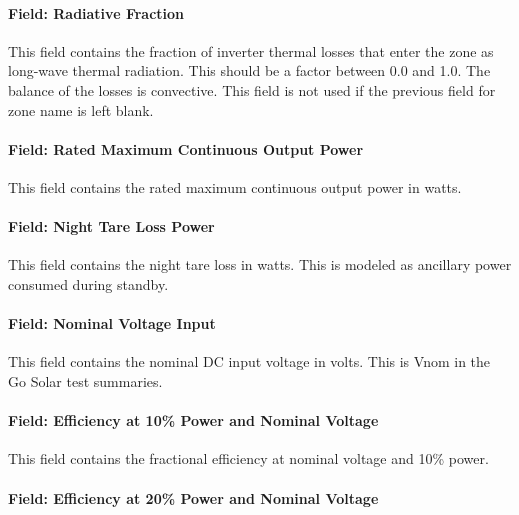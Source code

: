\paragraph{Field: Radiative Fraction}\label{field-radiative-fraction-3}

This field contains the fraction of inverter thermal losses that enter the zone as long-wave thermal radiation. This should be a factor between 0.0 and 1.0. The balance of the losses is convective. This field is not used if the previous field for zone name is left blank.

\paragraph{Field: Rated Maximum Continuous Output Power}\label{field-rated-maximum-continuous-output-power}

This field contains the rated maximum continuous output power in watts.

\paragraph{Field: Night Tare Loss Power}\label{field-night-tare-loss-power}

This field contains the night tare loss in watts. This is modeled as ancillary power consumed during standby.

\paragraph{Field: Nominal Voltage Input}\label{field-nominal-voltage-input}

This field contains the nominal DC input voltage in volts. This is Vnom in the Go Solar test summaries.

\paragraph{Field: Efficiency at 10\% Power and Nominal Voltage}\label{field-efficiency-at-10-power-and-nominal-voltage}

This field contains the fractional efficiency at nominal voltage and 10\% power.

\paragraph{Field: Efficiency at 20\% Power and Nominal Voltage}\label{field-efficiency-at-20-power-and-nominal-voltage}

